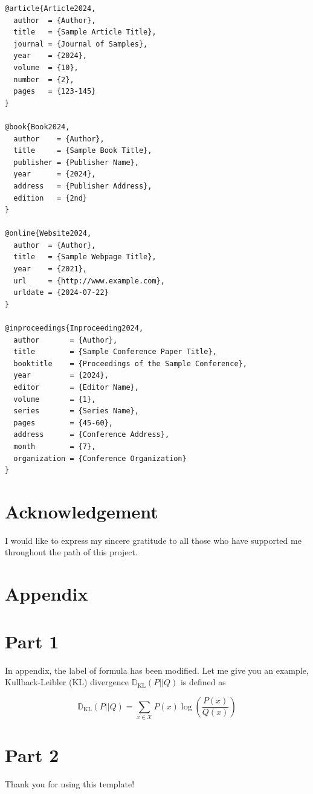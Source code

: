 \begin{lstlisting}
@article{Article2024,
  author  = {Author},
  title   = {Sample Article Title},
  journal = {Journal of Samples},
  year    = {2024},
  volume  = {10},
  number  = {2},
  pages   = {123-145}
}

@book{Book2024,
  author    = {Author},
  title     = {Sample Book Title},
  publisher = {Publisher Name},
  year      = {2024},
  address   = {Publisher Address},
  edition   = {2nd}
}

@online{Website2024,
  author  = {Author},
  title   = {Sample Webpage Title},
  year    = {2021},
  url     = {http://www.example.com},
  urldate = {2024-07-22}
}

@inproceedings{Inproceeding2024,
  author       = {Author},
  title        = {Sample Conference Paper Title},
  booktitle    = {Proceedings of the Sample Conference},
  year         = {2024},
  editor       = {Editor Name},
  volume       = {1},
  series       = {Series Name},
  pages        = {45-60},
  address      = {Conference Address},
  month        = {7},
  organization = {Conference Organization}
}
\end{lstlisting}


\section{Acknowledgement}
I would like to express my sincere gratitude to all those who have supported me throughout the path of this project.


\printbibliography[title={References}]

\newpage
\appendix
\section*{Appendix}
\setcounter{equation}{0}
\renewcommand{\theequation}{A.\arabic{equation}} 
\section{Part 1}\label{Appendix_A}
In appendix, the label of formula has been modified. Let me give you an example, Kullback-Leibler (KL) divergence $\mathbb{D}_{\mathrm{KL}}(P|| Q)$ is defined as

\begin{equation}
    \mathbb{D}_{\text{KL}}(P || Q)= \sum_{x \in \mathcal{X}} P(x)\log \left( \frac{P(x)}{Q(x)} \right) 
\end{equation}

\section{Part 2}\label{Appendix_B}
Thank you for using this template!





